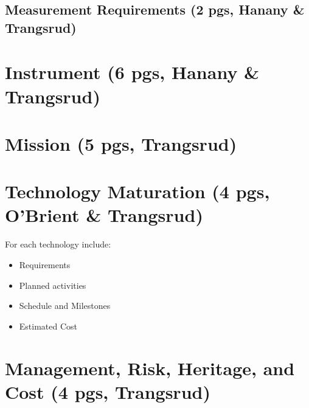 \documentclass[12pt]{article}
\begin{document}



\subsection{Measurement Requirements (2 pgs, Hanany \& Trangsrud)}





\section{Instrument (6 pgs, Hanany \& Trangsrud)}




\section{Mission (5 pgs, Trangsrud)}




\section{Technology Maturation (4 pgs, O'Brient \& Trangsrud)}



For each technology include:
\begin{itemize}
\item Requirements
\item Planned activities
\item Schedule and Milestones
\item Estimated Cost
\end{itemize}


\section{Management, Risk, Heritage, and Cost (4 pgs, Trangsrud)}




\newpage




\end{document}
